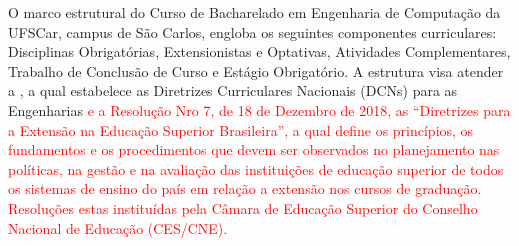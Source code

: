 
O marco estrutural do Curso de Bacharelado em Engenharia de Computação da UFSCar, campus de São Carlos, engloba os seguintes componentes curriculares: Disciplinas Obrigatórias, Extensionistas e Optativas,  Atividades Complementares, Trabalho de Conclusão de Curso e Estágio Obrigatório. A estrutura visa atender a , a qual estabelece as Diretrizes Curriculares Nacionais (DCNs) para as Engenharias \textcolor{red}{e a Resolução Nro 7, de 18 de Dezembro de 2018, as “Diretrizes para a Extensão na Educação Superior Brasileira”, a qual define os princípios, os fundamentos e os procedimentos que devem ser observados no planejamento nas políticas, na gestão e na avaliação das instituições de educação superior de todos os sistemas de ensino do país em relação a extensão nos cursos de graduação. Resoluções estas instituídas pela Câmara de Educação Superior do Conselho Nacional de Educação (CES/CNE).}




